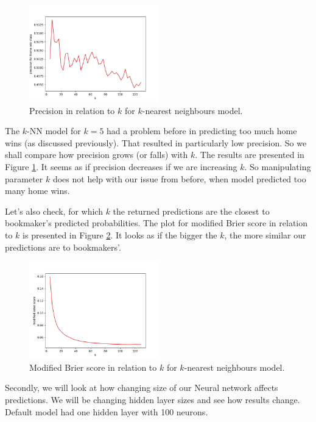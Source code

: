 \documentclass[conference]{IEEEtran}
\begin{document}
\begin{figure}[!ht]
\includegraphics[width=0.5\textwidth]{precision_k_knn.png}
\caption{Precision in relation to $k$ for $k$-nearest neighbours model.}
\label{prec-knn}
\end{figure}

The $k$-NN model for $k=5$ had a problem before in predicting too much home wins (as discussed 
previously). That resulted in particularly low precision. So we shall compare how precision grows (or 
falls) with $k$. The results are presented in Figure \ref{prec-knn}. It seems as if precision decreases if we are increasing $k$. So manipulating parameter $k$ does not help with our issue
from before, when model predicted too many home wins.

Let's also check, for which $k$ the returned predictions are the closest to bookmaker's 
predicted probabilities. The plot for modified Brier score in relation to $k$ is presented in Figure \ref{mbs-knn}. It looks as if the bigger the $k$, the more similar our predictions are to 
bookmakers'.

\begin{figure}[!ht]
\includegraphics[width=0.5\textwidth]{mbs_k_knn.png}
\caption{Modified Brier score in relation to $k$ for $k$-nearest neighbours model.}
\label{mbs-knn}
\end{figure}

Secondly, we will look at how changing size of our Neural network affects predictions.
We will be changing hidden layer sizes and see how results change. Default model had one
hidden layer with 100 neurons.
\end{document}
